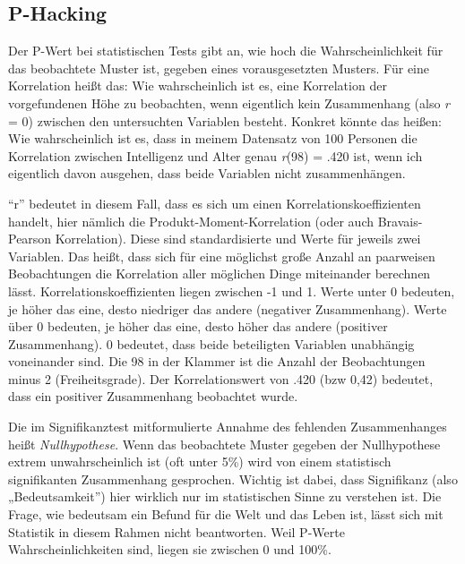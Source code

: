\documentclass[
  letterpaper,
  DIV=11,
  numbers=noendperiod]{scrreprt}
\begin{document}
\subsection{P-Hacking}\label{p-hacking}

Der P-Wert bei statistischen Tests gibt an, wie hoch die
Wahrscheinlichkeit für das beobachtete Muster ist, gegeben eines
vorausgesetzten Musters. Für eine Korrelation heißt das: Wie
wahrscheinlich ist es, eine Korrelation der vorgefundenen Höhe zu
beobachten, wenn eigentlich kein Zusammenhang (also \emph{r} = 0)
zwischen den untersuchten Variablen besteht. Konkret könnte das heißen:
Wie wahrscheinlich ist es, dass in meinem Datensatz von 100 Personen die
Korrelation zwischen Intelligenz und Alter genau \emph{r}(98) = .420
ist, wenn ich eigentlich davon ausgehen, dass beide Variablen nicht
zusammenhängen.

\begin{tcolorbox}[enhanced jigsaw, bottomrule=.15mm, toprule=.15mm, opacitybacktitle=0.6, breakable, colback=white, coltitle=black, bottomtitle=1mm, toptitle=1mm, titlerule=0mm, title=\textcolor{quarto-callout-note-color}{\faInfo}\hspace{0.5em}{Korrelation}, rightrule=.15mm, arc=.35mm, opacityback=0, leftrule=.75mm, left=2mm, colbacktitle=quarto-callout-note-color!10!white, colframe=quarto-callout-note-color-frame]

``r'' bedeutet in diesem Fall, dass es sich um einen
Korrelationskoeffizienten handelt, hier nämlich die
Produkt-Moment-Korrelation (oder auch Bravais-Pearson Korrelation).
Diese sind standardisierte und Werte für jeweils zwei Variablen. Das
heißt, dass sich für eine möglichst große Anzahl an paarweisen
Beobachtungen die Korrelation aller möglichen Dinge miteinander
berechnen lässt. Korrelationskoeffizienten liegen zwischen -1 und 1.
Werte unter 0 bedeuten, je höher das eine, desto niedriger das andere
(negativer Zusammenhang). Werte über 0 bedeuten, je höher das eine,
desto höher das andere (positiver Zusammenhang). 0 bedeutet, dass beide
beteiligten Variablen unabhängig voneinander sind. Die 98 in der Klammer
ist die Anzahl der Beobachtungen minus 2 (Freiheitsgrade). Der
Korrelationswert von .420 (bzw 0,42) bedeutet, dass ein positiver
Zusammenhang beobachtet wurde.

\end{tcolorbox}

Die im Signifikanztest mitformulierte Annahme des fehlenden
Zusammenhanges heißt \emph{Nullhypothese}. Wenn das beobachtete Muster
gegeben der Nullhypothese extrem unwahrscheinlich ist (oft unter 5\%)
wird von einem statistisch signifikanten Zusammenhang gesprochen.
Wichtig ist dabei, dass Signifikanz (also „Bedeutsamkeit'') hier
wirklich nur im statistischen Sinne zu verstehen ist. Die Frage, wie
bedeutsam ein Befund für die Welt und das Leben ist, lässt sich mit
Statistik in diesem Rahmen nicht beantworten. Weil P-Werte
Wahrscheinlichkeiten sind, liegen sie zwischen 0 und 100\%.
\end{document}
